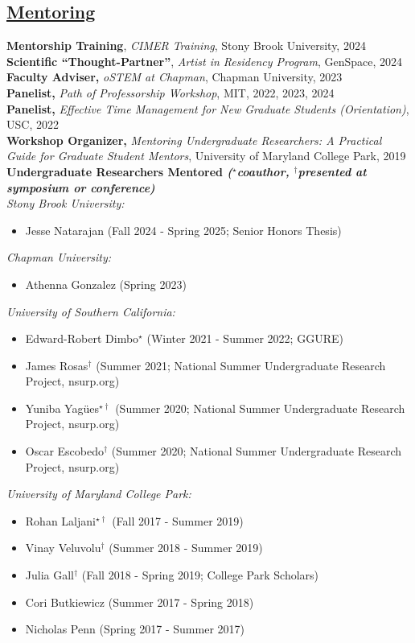 \documentclass[]{res}
\begin{document}
\begin{resume}
\section{\underline{Mentoring}} \vspace{2mm}
{\bf Mentorship Training}, \emph{CIMER Training}, Stony Brook University, 2024\\
{\bf Scientific ``Thought-Partner''}, \emph{Artist in Residency Program}, GenSpace, 2024\\
{\bf Faculty Adviser,} \emph{oSTEM at Chapman}, Chapman University, 2023\\
{\bf Panelist,} \emph{Path of Professorship Workshop}, MIT, 2022, 2023, 2024\\
{\bf Panelist,} \emph{Effective Time Management for New Graduate Students (Orientation)}, USC, 2022\\
{\bf Workshop Organizer,} \emph{Mentoring Undergraduate Researchers: A Practical Guide for Graduate Student Mentors}, University of Maryland College Park, 2019\\

\newpage
{\bf Undergraduate Researchers Mentored \emph{\footnotesize{($^{\star}$coauthor, $^{\dagger}$presented at symposium or conference)}}} \\
\emph{Stony Brook University:}
\begin{itemize}[leftmargin=*]
\item[] Jesse Natarajan (Fall 2024 - Spring 2025; Senior Honors Thesis)
\end{itemize}
\emph{Chapman University:}
\begin{itemize}[leftmargin=*]
\item[] Athenna Gonzalez (Spring 2023)
\end{itemize}
\emph{University of Southern California:}
\begin{itemize}[leftmargin=*]
\item[] Edward-Robert Dimbo$^{\star}$ (Winter 2021 - Summer 2022; GGURE)
\item[] James Rosas$^{\dagger}$ (Summer 2021; National Summer Undergraduate Research Project, nsurp.org)
\item[] Yuniba Yag{\"u}es$^{\star\dagger}$ (Summer 2020; National Summer Undergraduate Research Project, nsurp.org)
\item[] Oscar Escobedo$^{\dagger}$ (Summer 2020; National Summer Undergraduate Research Project, nsurp.org)
\end{itemize}
\vspace{1mm}
\emph{University of Maryland College Park:}
\begin{itemize}[leftmargin=*]
\item[] Rohan Laljani$^{\star\dagger}$ (Fall 2017 - Summer 2019)
\item[] Vinay Veluvolu$^{\dagger}$ (Summer 2018 - Summer 2019)
\item[] Julia Gall$^{\dagger}$ (Fall 2018 - Spring 2019; College Park Scholars)
\item[] Cori Butkiewicz (Summer 2017 - Spring 2018)
\item[] Nicholas Penn (Spring 2017 - Summer 2017)
\end{itemize}



\end{resume}
\end{document}
